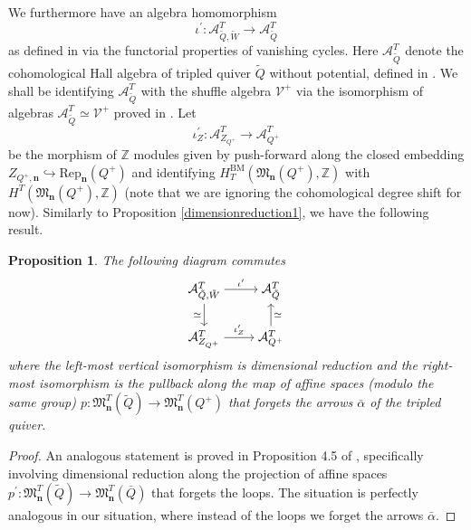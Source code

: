 \documentclass{amsart}
\newtheorem{proposition}[theorem]{Proposition}
\def\bn{{\boldsymbol{n}}}
\def\dalpha{\bar{\alpha}}
\def\dQ{\bar{Q}}
\begin{document}
We furthermore have an algebra homomorphism  
\begin{equation} \label{eqn:shuffle morphism} 
\iota^{\prime} \colon \mathcal{A}^T_{\tilde{Q},\tilde{W}} \rightarrow \mathcal{A}^T_{\tilde{Q}}
\end{equation}
as defined in \cite{botta2023okounkovs} via the functorial properties of vanishing cycles. Here $\mathcal{A}^T_{\tilde{Q}}$ denote the cohomological Hall algebra of tripled quiver $\tilde{Q}$ without potential, defined in \cite{KS}. We shall be identifying $\mathcal{A}^T_{\tilde{Q}} $ with the shuffle algebra $\mathcal{V}^+$ via the isomorphism of algebras $\mathcal{A}^T_{\tilde{Q}} \simeq \mathcal{V}^+$ proved in \cite[Theorem 2]{KS}. Let  
\[ 
\iota^{\prime}_Z: \mathcal{A}^T_{Z_{Q^+}} \rightarrow \mathcal{A}^T_{Q^+} 
\] 
be the morphism of $\mathbb{Z}$ modules given by push-forward along the closed embedding $Z_{Q^+,\bn} \hookrightarrow \mathrm{Rep}_{\bn}(Q^{+})$ and identifying $H_T^{\mathrm{BM}}(\mathfrak{M}_{\bn}(Q^+),\mathbb{Z})$ with $H^T(\mathfrak{M}_{\bn}(Q^+),\mathbb{Z})$ (note that we are ignoring the cohomological degree shift for now). Similarly to Proposition \ref{dimensionreduction1}, we have the following result.

\medskip 

\begin{proposition} \label{dimensionreduction2}
    The following diagram commutes\[\begin{tikzcd}[cramped]
	{\mathcal{A}^T_{\tilde{Q},\tilde{W}} } & {\mathcal{A}^T_{\tilde{Q}} } \\
	{\mathcal{A}^T_{Z_{Q^{+}}}} & {\mathcal{A}^T_{Q^+}}
	\arrow["{\iota^{\prime}}", from=1-1, to=1-2]
	\arrow["{\simeq }", swap, from=1-1, to=2-1]
	\arrow["\simeq", swap, from=2-2, to=1-2]
	\arrow["{\iota^{\prime}_Z}", from=2-1, to=2-2]
\end{tikzcd}\]
where the left-most vertical isomorphism is dimensional reduction and the right-most isomorphism is the pullback along the map of affine spaces (modulo the same group) $p: \mathfrak{M}^T_{\bn}(\tilde{Q}) \rightarrow \mathfrak{M}^T_{\bn}(Q^+)$ that forgets the arrows $\dalpha$ of the tripled quiver.
\end{proposition}

\medskip

\begin{proof} An analogous statement is proved in Proposition 4.5 of \cite{botta2023okounkovs}, specifically involving dimensional reduction along the projection of affine spaces $p^{\prime}: \mathfrak{M}^T_{\bn}(\tilde{Q}) \rightarrow \mathfrak{M}^T_{\bn}(\dQ)$ that forgets the loops. The situation is perfectly analogous in our situation, where instead of the loops we forget the arrows $\dalpha$. \end{proof}
\end{document}
